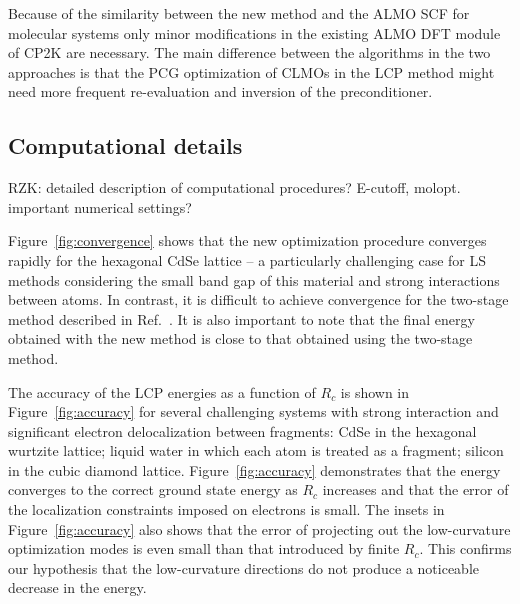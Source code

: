 \documentclass[aps,prl,twocolumn,reprint,amsmath,amssymb]{revtex4-1}
\begin{document}
Because of the similarity between the new method and the ALMO SCF for molecular systems only minor modifications in the existing ALMO DFT module of CP2K are necessary. The main difference between the algorithms in the two approaches is that the PCG optimization of CLMOs in the LCP method might need more frequent re-evaluation and inversion of the preconditioner.


\subsection{Computational details}

RZK: detailed description of computational procedures? E-cutoff, molopt. important numerical settings?


Figure~\ref{fig:convergence} shows that the new optimization procedure converges rapidly for the hexagonal CdSe lattice -- a particularly challenging case for LS methods considering the small band gap of this material and strong interactions between atoms. 
In contrast, it is difficult to achieve convergence for the two-stage method described in Ref.~\cite{khaliullin2013efficient}. 
It is also important to note that the final energy obtained with the new method is close to that obtained using the two-stage method. %


The accuracy of the LCP energies as a function of $R_c$ is shown in Figure~\ref{fig:accuracy} for several challenging systems with strong interaction and significant electron delocalization between fragments: CdSe in the hexagonal wurtzite lattice; liquid water in which each atom is treated as a fragment; silicon in the cubic diamond lattice. 
Figure~\ref{fig:accuracy} demonstrates that the energy converges to the correct ground state energy as $R_c$ increases and that the error of the localization constraints imposed on electrons is small. The insets in Figure~\ref{fig:accuracy} also shows that the error of projecting out the low-curvature optimization modes is even small than that introduced by finite $R_c$. This confirms our hypothesis that the low-curvature directions do not produce a noticeable decrease in the energy.
\end{document}
